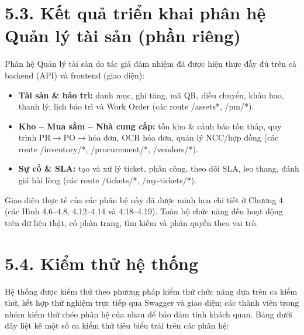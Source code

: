 \section*{5.3. Kết quả triển khai phân hệ Quản lý tài sản (phần riêng)}
Phân hệ Quản lý tài sản do tác giả đảm nhiệm đã được hiện thực đầy đủ trên cả backend (API) và frontend (giao diện):

\begin{itemize}[leftmargin=1.4em,itemsep=1pt,topsep=2pt]
  \item \textbf{Tài sản \& bảo trì: }danh mục, ghi tăng, mã QR, điều chuyển, khấu hao, thanh lý; lịch bảo trì và Work Order (các route /assets*, /pm/*).
  \item \textbf{Kho – Mua sắm – Nhà cung cấp: }tồn kho \& cảnh báo tồn thấp, quy trình PR$\rightarrow$PO$\rightarrow$hóa đơn, OCR hóa đơn, quản lý NCC/hợp đồng (các route /inventory/*, /procurement/*, /vendors/*).
  \item \textbf{Sự cố \& SLA: }tạo và xử lý ticket, phân công, theo dõi SLA, leo thang, đánh giá hài lòng (các route /tickets/*, /my-tickets/*).
\end{itemize}
Giao diện thực tế của các phân hệ này đã được minh họa chi tiết ở Chương 4 (các Hình 4.6–4.8, 4.12–4.14 và 4.18–4.19). Toàn bộ chức năng đều hoạt động trên dữ liệu thật, có phân trang, tìm kiếm và phân quyền theo vai trò.

\section*{5.4. Kiểm thử hệ thống}
Hệ thống được kiểm thử theo phương pháp kiểm thử chức năng dựa trên ca kiểm thử, kết hợp thử nghiệm trực tiếp qua Swagger và giao diện; các thành viên trong nhóm kiểm thử chéo phân hệ của nhau để bảo đảm tính khách quan. Bảng dưới đây liệt kê một số ca kiểm thử tiêu biểu trải trên các phân hệ:

